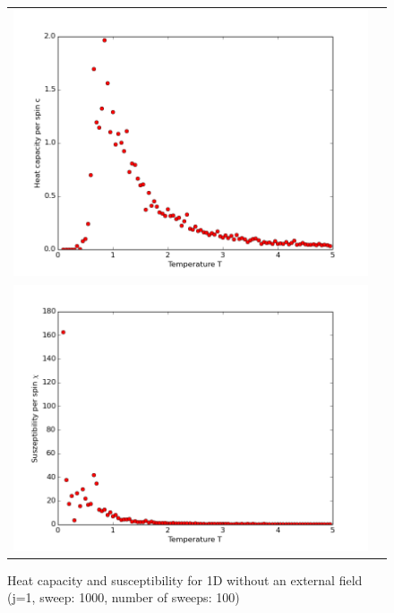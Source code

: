 \documentclass[12pt,a4paper,titlepage]{article}
\begin{document}
\begin{figure}
\centering
\begin{tabular}{cc}
\includegraphics[width=13cm]{Plots/Heat_Capacitiy_1}\\
\includegraphics[width=13cm]{Plots/Suszeptibility_1} \\
\end{tabular} 
\caption{Heat capacity and susceptibility for 1D without an external field (j=1, sweep: 1000, number of sweeps: 100)}
\label{fig:1dheatsusz}
\end{figure}
\end{document}
